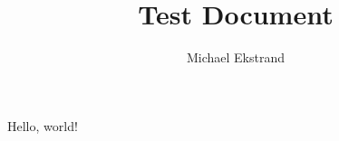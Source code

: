 \documentclass[12pt,letterpaper]{article}
\title{Test Document}
\author{Michael Ekstrand}
\begin{document}
\maketitle

Hello, world!
\end{document}
